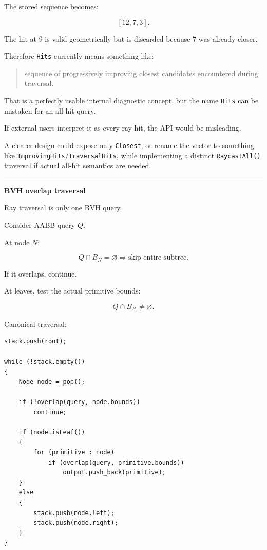 The stored sequence becomes:

\[
[12,7,3].
\]

The hit at 9 is valid geometrically but is discarded because 7 was already closer.

Therefore \texttt{Hits} currently means something like:

\begin{quote}
sequence of progressively improving closest candidates encountered during traversal.
\end{quote}

That is a perfectly usable internal diagnostic concept, but the name \texttt{Hits} can be mistaken for an all-hit query.

If external users interpret it as every ray hit, the API would be misleading.

A clearer design could expose only \texttt{Closest}, or rename the vector to something like \texttt{ImprovingHits}/\texttt{TraversalHits}, while implementing a distinct \texttt{RaycastAll()} traversal if actual all-hit semantics are needed.

\begin{center}\rule{0.5\linewidth}{0.5pt}\end{center}

\textbf{BVH overlap traversal}

Ray traversal is only one BVH query.

Consider AABB query \(Q\).

At node \(N\):

\[
Q\cap B_N=\varnothing
\Rightarrow
\text{skip entire subtree}.
\]

If it overlaps, continue.

At leaves, test the actual primitive bounds:

\[
Q\cap B_{P_i}\ne\varnothing.
\]

Canonical traversal:

\begin{verbatim}
stack.push(root);

while (!stack.empty())
{
    Node node = pop();

    if (!overlap(query, node.bounds))
        continue;

    if (node.isLeaf())
    {
        for (primitive : node)
            if (overlap(query, primitive.bounds))
                output.push_back(primitive);
    }
    else
    {
        stack.push(node.left);
        stack.push(node.right);
    }
}
\end{verbatim}

